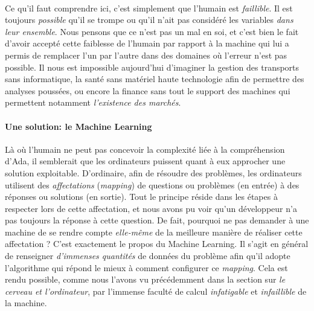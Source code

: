 \paragraph{} Ce qu'il faut comprendre ici, c'est simplement que l'humain est \emph{faillible}. Il est toujours \emph{possible} qu'il se trompe
ou qu'il n'ait pas considéré les variables \emph{dans leur ensemble}. Nous pensons que ce n'est pas un mal en soi, et c'est bien le fait d'avoir accepté cette
faiblesse de l'humain par rapport à la machine qui lui a permis de remplacer l'un par l'autre dans des domaines où l'erreur n'est pas possible.
Il nous est impossible aujourd'hui d'imaginer la gestion des transports sans informatique, la santé sans matériel haute technologie afin de
permettre des analyses poussées, ou encore la finance sans tout le support des machines qui permettent notamment \emph{l'existence des marchés}. 

\paragraph{Une solution: le Machine Learning} Là où l'humain ne peut pas concevoir la complexité liée à la compréhension d'Ada, il semblerait que les
ordinateurs puissent quant à eux approcher une solution exploitable. D'ordinaire, afin de résoudre des problèmes, les ordinateurs utilisent des \emph{affectations}
(\emph{mapping}) de questions ou problèmes (en entrée) à des réponses ou solutions (en sortie). Tout le principe réside dans les étapes à respecter lors de
cette affectation, et nous avons pu voir qu'un développeur n'a pas toujours la réponse à cette question. De fait, pourquoi ne pas demander à une 
machine de se rendre compte \emph{elle-même} de la meilleure manière de réaliser cette affectation ? \cite{MachineLearning0} C'est exactement le propos du Machine
Learning. Il s'agit en général de renseigner \emph{d'immenses quantités} de données du problème afin qu'il adopte l'algorithme qui répond le mieux à
comment configurer ce \emph{mapping}. Cela est rendu possible, comme nous l'avons vu précédemment dans la section sur \emph{le cerveau et l'ordinateur},
par l'immense faculté de calcul \emph{infatigable} et \emph{infaillible} de la machine.

